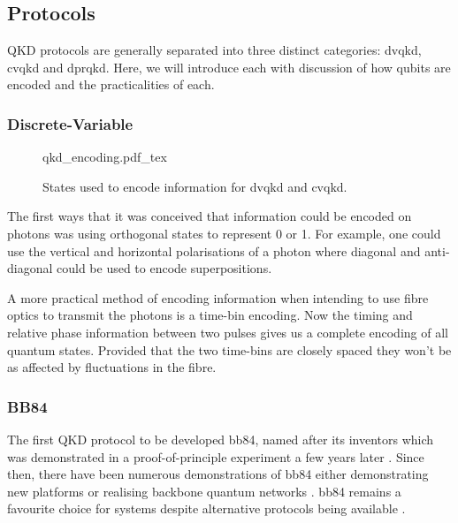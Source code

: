 
\subsection{Protocols}

\Ac{QKD} protocols are generally separated into three distinct categories: \acf{dvqkd}, \acf{cvqkd} and \acf{dprqkd}. Here, we will introduce each with discussion of how qubits are encoded and the practicalities of each.

\subsubsection{Discrete-Variable}

\begin{figure}
	\centering
	\def\svgwidth{0.9\textwidth}
   	{qkd_encoding.pdf_tex}
   	\caption[\acs{dvqkd} and \acs{cvqkd} encoding]{States used to encode information for \acs{dvqkd} and \acs{cvqkd}.}
\end{figure}

The first ways that it was conceived that information could be encoded on photons was using orthogonal states to represent 0 or 1. For example, one could use the vertical and horizontal polarisations of a photon where diagonal and anti-diagonal could be used to encode superpositions. 

A more practical method of encoding information when intending to use fibre optics to transmit the photons is a time-bin encoding. Now the timing and relative phase information between two pulses gives us a complete encoding of all quantum states. Provided that the two time-bins are closely spaced they won't be as affected by fluctuations in the fibre.

\subsubsection*{BB84}

The first \ac{QKD} protocol to be developed \ac{bb84}, named after its inventors \cite{BB84} which was demonstrated in a proof-of-principle experiment a few years later \cite{bennett1992experimental}. Since then, there have been numerous demonstrations of \ac{bb84} either demonstrating new platforms or realising backbone quantum networks \cite{pirandola2019advances}. \Ac{bb84} remains a favourite choice for systems despite alternative protocols being available \cite{sarg2004, DPS-QKD, COW-QKD, B92}.

